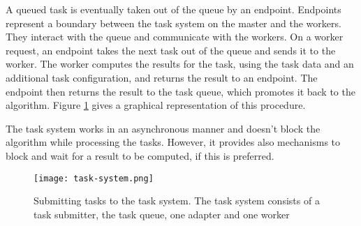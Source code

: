 A queued task is eventually taken out of the queue by an endpoint. Endpoints represent a boundary between the task system on the master and the workers. They interact with the queue and communicate with the workers. On a worker request, an endpoint takes the next task out of the queue and sends it to the worker. The worker computes the results for the task, using the task data and an additional task configuration, and returns the result to an endpoint. The endpoint then returns the result to the task queue, which promotes it back to the algorithm. Figure \ref{fig:task-system} gives a graphical representation of this procedure.

The task system works in an asynchronous manner and doesn't block the algorithm while processing the tasks. However, it provides also mechanisms to block and wait for a result to be computed, if this is preferred.

\begin{figure}[ht!]
  \centering
  \texttt{[image: task-system.png]}
  \caption{Submitting tasks to the task system. The task system consists of a task submitter, the task queue, one adapter and one worker}
  \label{fig:task-system}
\end{figure}

